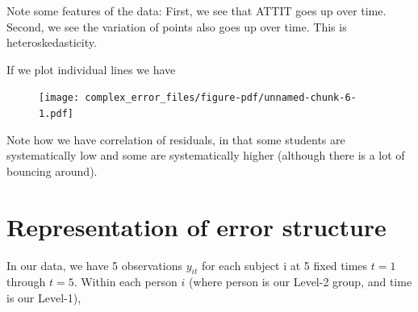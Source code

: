\documentclass[
  letterpaper,
  DIV=11,
  numbers=noendperiod]{scrreprt}
\newenvironment{Shaded}{\begin{snugshade}}{\end{snugshade}}
\newcommand{\AttributeTok}[1]{\textcolor[rgb]{0.49,0.56,0.16}{#1}}
\newcommand{\FloatTok}[1]{\textcolor[rgb]{0.25,0.63,0.44}{#1}}
\newcommand{\FunctionTok}[1]{\textcolor[rgb]{0.02,0.16,0.49}{#1}}
\newcommand{\NormalTok}[1]{\textcolor[rgb]{0.00,0.44,0.13}{#1}}
\newcommand{\OtherTok}[1]{\textcolor[rgb]{0.00,0.44,0.13}{#1}}
\newcommand{\SpecialCharTok}[1]{\textcolor[rgb]{0.25,0.44,0.63}{#1}}
\begin{document}
Note some features of the data: First, we see that ATTIT goes up over
time. Second, we see the variation of points also goes up over time.
This is heteroskedasticity.

If we plot individual lines we have

\begin{Shaded}
\end{Shaded}

\begin{figure}[H]

{\centering \texttt{[image: complex\_error\_files/figure-pdf/unnamed-chunk-6-1.pdf]}

}

\end{figure}

Note how we have correlation of residuals, in that some students are
systematically low and some are systematically higher (although there is
a lot of bouncing around).

\hypertarget{representation-of-error-structure}{%
\section{Representation of error
structure}\label{representation-of-error-structure}}

In our data, we have 5 observations \(y_{it}\) for each subject i at 5
fixed times \(t=1\) through \(t=5\). Within each person \(i\) (where
person is our Level-2 group, and time is our Level-1),
\end{document}
